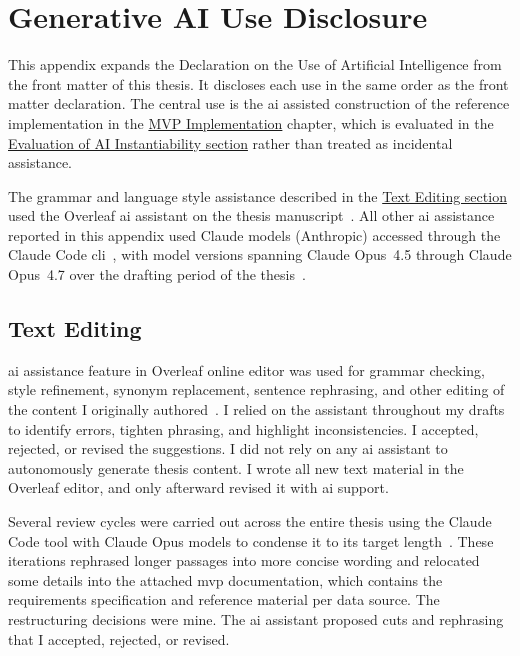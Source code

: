 \chapter{Generative AI Use Disclosure}
\label{app:genai}

This appendix expands the Declaration on the Use of Artificial Intelligence from the front matter of this thesis. It discloses each use in the same order as the front matter declaration. The central use is the \gls{ai} assisted construction of the reference implementation in the \hyperref[ch:implementation]{MVP Implementation} chapter, which is evaluated in the \hyperref[sec:ai-eval]{Evaluation of AI Instantiability section} rather than treated as incidental assistance.

The grammar and language style assistance described in the \hyperref[sec:genai-text-editing]{Text Editing section} used the Overleaf \gls{ai} assistant on the thesis manuscript~\parencite{Overleaf2026AIAssistant}. All other \gls{ai} assistance reported in this appendix used Claude models (Anthropic) accessed through the Claude Code \gls{cli}~\parencite{Anthropic2026ClaudeCode}, with model versions spanning Claude Opus~4.5 through Claude Opus~4.7 over the drafting period of the thesis~\parencite{Anthropic2025ClaudeOpus45, Anthropic2026ClaudeOpus46, Anthropic2026ClaudeOpus47}.

\section{Text Editing}
\label{sec:genai-text-editing}

\Gls{ai} assistance feature in Overleaf online editor was used for grammar checking, style refinement, synonym replacement, sentence rephrasing, and other editing of the content I originally authored~\parencite{Overleaf2026AIAssistant}. I relied on the assistant throughout my drafts to identify errors, tighten phrasing, and highlight inconsistencies. I accepted, rejected, or revised the suggestions. I did not rely on any \gls{ai} assistant to autonomously generate thesis content. I wrote all new text material in the Overleaf editor, and only afterward revised it with \Gls{ai} support.

Several review cycles were carried out across the entire thesis using the Claude Code tool with Claude Opus models to condense it to its target length~\parencite{Anthropic2026ClaudeCode, Anthropic2025ClaudeOpus45, Anthropic2026ClaudeOpus46, Anthropic2026ClaudeOpus47}. These iterations rephrased longer passages into more concise wording and relocated some details into the attached \gls{mvp} documentation, which contains the requirements specification and reference material per data source. The restructuring decisions were mine. The \gls{ai} assistant proposed cuts and rephrasing that I accepted, rejected, or revised.

